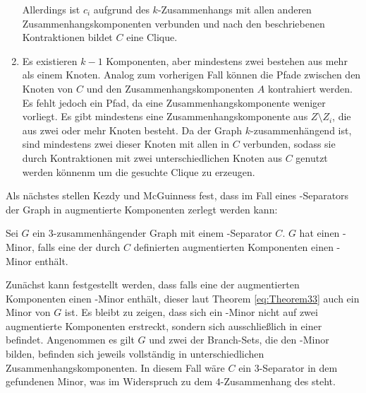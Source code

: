\begin{beweis}
\begin{enumerate}
          Allerdings ist $c_i$ aufgrund des $k$-Zusammenhangs mit allen anderen Zusammenhangskomponenten verbunden und nach den beschriebenen Kontraktionen bildet $C$ eine Clique.
    \item Es existieren $k-1$ Komponenten, aber mindestens zwei bestehen aus mehr als einem Knoten.
          Analog zum vorherigen Fall können die Pfade zwischen den Knoten von $C$ und den Zusammenhangskomponenten $A$ kontrahiert werden.
          Es fehlt jedoch ein Pfad, da eine Zusammenhangskomponente weniger vorliegt.
          Es gibt mindestens eine Zusammenhangskomponente aus $Z \setminus Z_i$, die aus zwei oder mehr Knoten besteht.
          Da der Graph $k$-zusammenhängend ist, sind mindestens zwei dieser Knoten mit allen in $C$ verbunden, sodass sie durch Kontraktionen mit zwei unterschiedlichen Knoten aus $C$ genutzt werden könnenm um die gesuchte Clique zu erzeugen.
  \end{enumerate}
\end{beweis}

Als nächstes stellen Kezdy und McGuinness fest, dass im Fall eines \dd-Separators der Graph in augmentierte Komponenten zerlegt werden kann:
\begin{theorem}\label{eq:Theorem34}
  Sei $G$ ein $3$-zusammenhängender Graph mit einem \dd-Separator $C$.
  $G$ hat einen \kf-Minor, falls eine der durch $C$ definierten augmentierten Komponenten einen \kf-Minor enthält.
\end{theorem}
\begin{beweis}
  Zunächst kann festgestellt werden, dass falls eine der augmentierten Komponenten einen \kf-Minor enthält, dieser laut Theorem \ref{eq:Theorem33} auch ein Minor von $G$ ist.
  Es bleibt zu zeigen, dass sich ein \kf-Minor nicht auf zwei augmentierte Komponenten erstreckt, sondern sich ausschließlich in einer befindet.
  Angenommen es gilt \kf \minor $G$ und zwei der Branch-Sets, die den \kf-Minor bilden, befinden sich jeweils vollständig in unterschiedlichen Zusammenhangskomponenten.
  In diesem Fall wäre $C$ ein $3$-Separator in dem gefundenen Minor, was im Widerspruch zu dem $4$-Zusammenhang des \kf steht.
\end{beweis}

